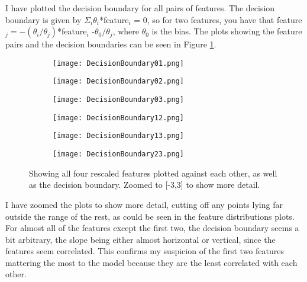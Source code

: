 

I have plotted the decision boundary for all pairs of features. 
The decision boundary is given by $\Sigma_i \theta_i$*feature$_i$ = 0, so for two features, you have that feature$_j = -(\theta_i/\theta_j)$*feature$_i$ -$\theta_0/\theta_j$, where $\theta_0$ is the bias.
The plots showing the feature pairs and the decision boundaries can be seen in Figure \ref{fig:DB}.

\begin{figure}[ht!]
\begin{center}
        \begin{subfigure}{.49\textwidth}
      \centering
      \texttt{[image: DecisionBoundary01.png]}
    \end{subfigure}
    \begin{subfigure}{.49\textwidth}
      \centering
      \texttt{[image: DecisionBoundary02.png]}
    \end{subfigure}
    \begin{subfigure}{.49\textwidth}
      \centering
      \texttt{[image: DecisionBoundary03.png]}
    \end{subfigure}
    \begin{subfigure}{.49\textwidth}
      \centering
      \texttt{[image: DecisionBoundary12.png]}
    \end{subfigure}
    \begin{subfigure}{.49\textwidth}
      \centering
      \texttt{[image: DecisionBoundary13.png]}
    \end{subfigure}
    \begin{subfigure}{.49\textwidth}
      \centering
      \texttt{[image: DecisionBoundary23.png]}
    \end{subfigure}
    \caption{Showing all four rescaled features plotted against each other, as well as the decision boundary. Zoomed to [-3,3] to show more detail.}
    \label{fig:DB}
\end{center}
\end{figure}


I have zoomed the plots to show more detail, cutting off any points lying far outside the range of the rest, as could be seen in the feature distributions plots.
For almost all of the features except the first two, the decision boundary seems a bit arbitrary, the slope being either almost horizontal or vertical, since the features seem correlated. 
This confirms my suspicion of the first two features mattering the most to the model because they are the least correlated with each other.



















